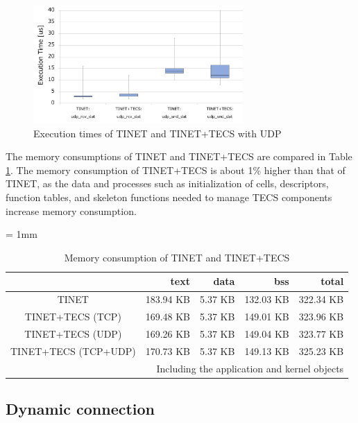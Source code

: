 \documentclass[JIP]{ipsj_v2/UTF8/ipsj}
\begin{document}
\begin{figure}[t]
    \centering
    \includegraphics[width=8cm,clip]{figure/EvaluationOfExecutionTimeUDP.pdf}
    \caption{Execution times of TINET and TINET+TECS with UDP}
    \label{fig:EvaluationOfExecutionTimeUDP}
\end{figure}

The memory consumptions of TINET and TINET+TECS are compared in Table \ref{tab:EvaluationOfMemoryConsumption}.
The memory consumption of TINET+TECS is about 1\% higher than that of TINET, as the data and processes such as initialization of cells, descriptors, function tables, and skeleton functions needed to manage TECS components increase memory consumption.

\begin{table}[t]
    \centering
    \caption{Memory consumption of TINET and TINET+TECS}
    {\tabcolsep = 1mm
    \begin{tabular}{c|r|r|r|r}
        \hline\hline
                               &   text       &  data    &   bss      &  total     \\ \hline
        TINET                  &   183.94 KB  &  5.37 KB &  132.03 KB &  322.34 KB \\
        TINET+TECS (TCP)       &   169.48 KB  &  5.37 KB &  149.01 KB &  323.96 KB \\
        TINET+TECS (UDP)       &   169.26 KB  &  5.37 KB &  149.04 KB &  323.77 KB \\
        TINET+TECS (TCP+UDP)   &   170.73 KB  &  5.37 KB &  149.13 KB &  325.23 KB \\
        \hline
        \multicolumn{5}{r}{Including the application and kernel objects}
    \end{tabular}
    }
    \label{tab:EvaluationOfMemoryConsumption}
\end{table}

\subsection{Dynamic connection}
\end{document}
